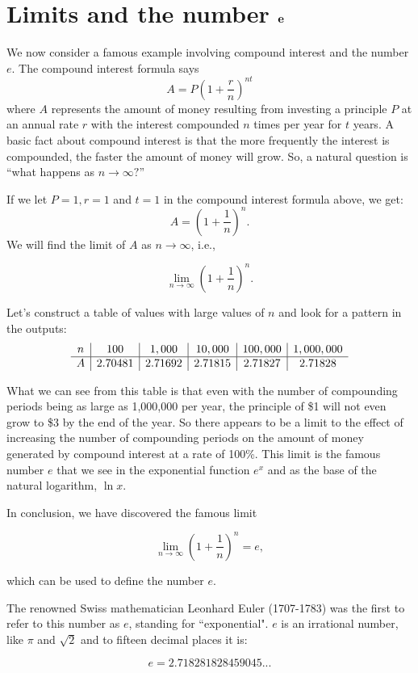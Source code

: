 \documentclass[handout]{ximera}
\begin{document}
\section{Limits and the number ${\bf e}$}


We now consider a famous example involving compound interest and the number $e$.
The compound interest formula says 
\[ A = P\left(1+\frac{r}{n}\right)^{nt} \]
where $A$ represents the amount of money resulting from investing a principle $P$ at an annual rate $r$ with 
the interest compounded $n$ times per year for $t$ years.  A basic fact about compound interest is that the more frequently 
the interest is compounded, the faster the amount of money will grow. 
So, a natural question is ``what happens as $n \to \infty?$''



\begin{example}[example 7]
If we let $P=1, r= 1$ and $t=1$ in the compound interest formula above, we get:
\[
A = \left(1 + \frac{1}{n}\right)^n.
\]
 We will find the limit of $A$ as $n \to \infty$, i.e., 

\[
\lim_{n \to \infty} \left(1+\frac{1}{n}\right)^n.
\]

Let's construct a table of values with large values of $n$ and look for a pattern in the outputs:
\[
\begin{array}{ c | c | c | c | c|c}
  n & 100 & 1,000 & 10,000 & 100,000 & 1,000,000\\ 
	\hline
	A & 2.70481 & 2.71692 & 2.71815 & 2.71827 & 2.71828
	\end{array}
\] 

What we can see from this table is that even with the number of compounding periods being as large as 1,000,000 per year, 
the principle of \$1 will not even grow to \$3 by the end of the year.  So there appears to be a limit to the effect of increasing the 
number of compounding periods on the amount of money generated by compound interest at a rate of 100\%. 
This limit is the famous number $e$ that we see in the exponential function $e^x$ and as the base of the natural logarithm, $\ln x$.

In conclusion, we have discovered the famous limit

\[\lim_{n \to \infty} \left(1+\frac{1}{n}\right)^n = e,\]

which can be used to define the number $e$.

The renowned Swiss mathematician Leonhard Euler (1707-1783) was the first to refer to this number as $e$,
standing for ``exponential".  $e$ is an irrational number, like $\pi$ and $\sqrt 2$ and to fifteen decimal places it is:

\[ e = 2.718281828459045... \]

\end{example}
\end{document}
